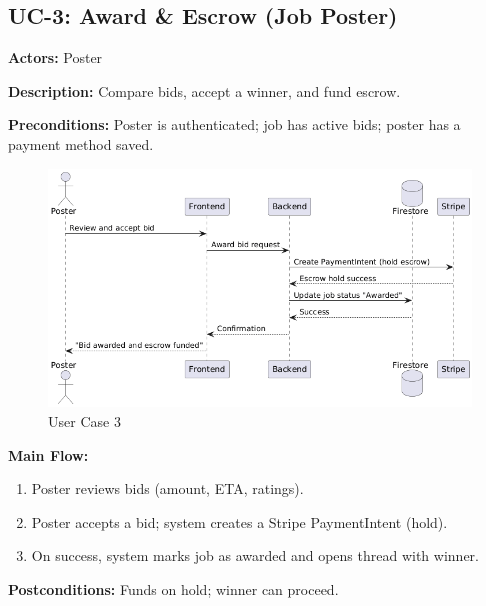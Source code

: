 \documentclass[11pt]{article}
\begin{document}
\subsection{UC-3: Award \& Escrow (Job Poster)}
\textbf{Actors:} Poster \par
\textbf{Description:} Compare bids, accept a winner, and fund escrow.\par
\textbf{Preconditions:} Poster is authenticated; job has active bids; poster has a payment method saved.\par
\begin{figure}[h]
  \centering
\includegraphics[width=0.9\linewidth]{UC-3.png}
  \caption{User Case 3}
\end{figure} \par
\textbf{Main Flow:}
\begin{enumerate}[leftmargin=1.4em]
  \item Poster reviews bids (amount, ETA, ratings).
  \item Poster accepts a bid; system creates a Stripe PaymentIntent (hold).
  \item On success, system marks job as awarded and opens thread with winner.
\end{enumerate}
\textbf{Postconditions:} Funds on hold; winner can proceed.
\end{document}
